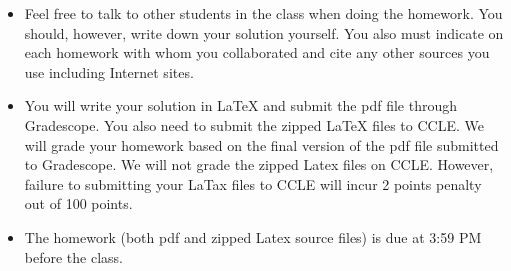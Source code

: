 \documentclass[12pt,letterpaper]{article}
\begin{document}
\begin{footnotesize}
	\begin{itemize}
		\item Feel free to talk to other students in the class when doing the homework. You should, however, write down your solution yourself. You also must indicate on each homework with whom you collaborated and cite any other sources you use including
		Internet sites.
		\item You will write your solution in LaTeX and submit the pdf file through Gradescope. You also need to submit the zipped LaTeX files to CCLE.
		We will grade your homework based on the final  version of the pdf file submitted to Gradescope. We will not grade the zipped Latex files on CCLE. However, failure to submitting your LaTax files to CCLE will incur 2 points penalty out of 100 points.	
				\item The homework (both pdf and zipped Latex source files) is due at 3:59 PM before the class.
	\end{itemize}
\end{footnotesize}
\end{document}

